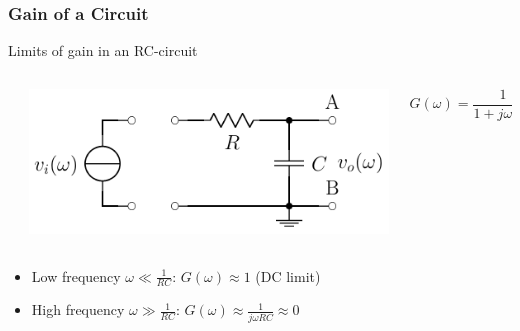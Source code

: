 \documentclass[beamer]{standalone}
\begin{document}
\begin{frame}
 \frametitle{Gain of a Circuit}
 \begin{block}{Limits of gain in an RC-circuit}
  \begin{columns}
   \begin{column}{0.0\textwidth}
   \end{column}
   \begin{column}{0.5\textwidth}
    \includegraphics[width=\textwidth]{pics/RC_filter}
   \end{column}
   \begin{column}{0.5\textwidth}
    \begin{equation*}
     G(\omega) = \frac{1}{1 + j\omega R C}
    \end{equation*}
   \end{column}
  \end{columns}
  \begin{itemize}
   \item Low frequency $\omega \ll \frac{1}{RC}$: $G(\omega) \approx 1$ (DC limit)
   \item High frequency $\omega \gg \frac{1}{RC}$: $G(\omega) \approx \frac{1}{j\omega R C} \approx 0$
  \end{itemize}
 \end{block}
\end{frame}
\end{document}
